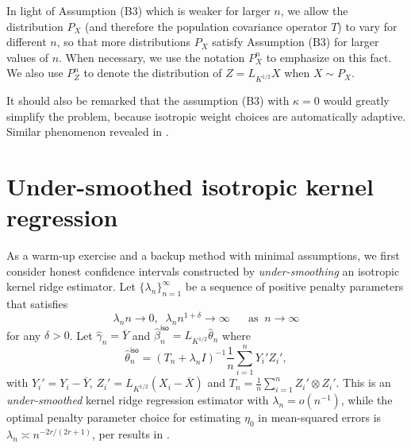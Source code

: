 \documentclass[11pt,a4paper]{article}
\renewcommand{\hat}{\widehat}
\renewcommand{\bar}{\overline}
\theoremstyle{definition}
\theoremstyle{plain}
\theoremstyle{remark}
\newcommand{\iso}{\mathsf{iso}}
\begin{document}
%
%

{\color{blue}In light of Assumption (B3) which is weaker for larger $n$, we allow the distribution $P_X$ (and therefore the population covariance operator $T$) to vary for different $n$,
so that more distributions $P_X$ satisfy Assumption (B3) for larger values of $n$.
When necessary, we use the notation $P_X^n$ to emphasize on this fact.
We also use $P_Z^n$ to denote the distribution of $Z=L_{K^{1/2}}X$ when $X\sim P_X$.}

{\color{red}It should also be remarked that the assumption (B3) with $\kappa=0$ would greatly simplify the problem, because isotropic weight choices are automatically adaptive.
Similar phenomenon revealed in \citep{liu2025scalable}.}

\section{Under-smoothed isotropic kernel regression}\label{sec:isotropic}

As a warm-up exercise and a backup method with minimal assumptions, we first consider honest confidence intervals constructed by \emph{under-smoothing} an isotropic kernel ridge estimator.
Let $\{\lambda_n\}_{n=1}^{\infty}$ be a sequence of positive penalty parameters that satisfies
\begin{equation}
\lambda_n n \to 0,\;\; \lambda_n n^{1+\delta}\to \infty\;\;\;\;\;\;\text{as}\;\;n\to\infty
\label{eq:lambdan-1}
\end{equation}
for any $\delta>0$.
Let $\hat\gamma_n = \bar Y$ and $\hat\beta_n^\iso=L_{K^{1/2}}\hat\theta_n$ where 
$$
\hat\theta_n^\iso = (T_n+\lambda_n I)^{-1}\frac{1}{n}\sum_{i=1}^n Y_i'Z_i',
$$
with $Y_i'=Y_i-\bar Y$, $Z_i'=L_{K^{1/2}}(X_i-\bar X)$ and $T_n=\frac{1}{n}\sum_{i=1}^n Z_i'\otimes Z_i'$.
This is an \emph{under-smoothed} kernel ridge regression estimator with $\lambda_n=o(n^{-1})$, while the optimal penalty parameter choice for estimating $\eta_0$ in mean-squared errors 
is $\lambda_n\asymp n^{-2r/(2r+1)}$, per results in \cite{cai2012minimax}.
\end{document}
